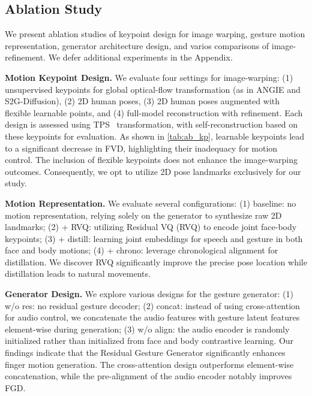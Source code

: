 \vspace{-0.2cm}
\subsection{Ablation Study}
\label{subsec:ablation}


We present ablation studies of keypoint design for image warping, gesture motion representation, generator architecture design, and varios comparisons of image-refinement. We defer additional experiments in the Appendix.

\noindent \textbf{Motion Keypoint Design.}  
We evaluate four settings for image-warping: (1) unsupervised keypoints for global optical-flow transformation (as in ANGIE and S2G-Diffusion), (2) 2D human poses, (3) 2D human poses augmented with flexible learnable points, and (4) full-model reconstruction with refinement. Each design is assessed using TPS~\cite{zhao2022thin} transformation, with self-reconstruction based on these keypoints for evaluation. As shown in \cref{tab:ab_kp}, learnable keypoints lead to a significant decrease in FVD, highlighting their inadequacy for motion control. The inclusion of flexible keypoints does not enhance the image-warping outcomes. Consequently, we opt to utilize 2D pose landmarks exclusively for our study.

\noindent \textbf{Motion Representation.}  
We evaluate several configurations: (1) baseline: no motion representation, relying solely on the generator to synthesize raw 2D landmarks; (2) + RVQ: utilizing Residual VQ (RVQ) to encode joint face-body keypoints; (3) + distill: learning joint embeddings for speech and gesture in both face and body motions; (4) + chrono: leverage chronological alignment for distillation. We discover RVQ significantly improve the precise pose location while distillation leads to natural movements.

\noindent \textbf{Generator Design.}  
We explore various designs for the gesture generator: (1) w/o res: no residual gesture decoder; (2) concat: instead of using cross-attention for audio control, we concatenate the audio features with gesture latent features element-wise during generation; (3) w/o align: the audio encoder is randomly initialized rather than initialized from face and body contrastive learning. Our findings indicate that the Residual Gesture Generator significantly enhances finger motion generation. The cross-attention design outperforms element-wise concatenation, while the pre-alignment of the audio encoder notably improves FGD.



